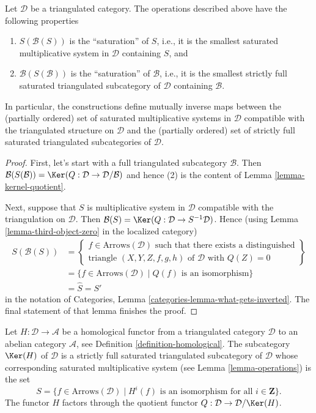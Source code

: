 \begin{lemma}
\label{lemma-operations}
Let $\mathcal{D}$ be a triangulated category. The operations described above
have the following properties
\begin{enumerate}
\item $S(\mathcal{B}(S))$ is the ``saturation'' of $S$, i.e., it is the
smallest saturated multiplicative system in $\mathcal{D}$ containing $S$, and
\item $\mathcal{B}(S(\mathcal{B}))$ is the ``saturation'' of $\mathcal{B}$,
i.e., it is the smallest strictly full saturated triangulated subcategory of
$\mathcal{D}$ containing $\mathcal{B}$.
\end{enumerate}
In particular, the constructions define mutually inverse maps between
the (partially ordered) set of saturated multiplicative systems in
$\mathcal{D}$ compatible with the triangulated structure on $\mathcal{D}$
and
the (partially ordered) set of strictly full saturated triangulated
subcategories of $\mathcal{D}$.
\end{lemma}

\begin{proof}
First, let's start with a full triangulated subcategory $\mathcal{B}$. Then
$\mathcal{B}(S(\mathcal{B})) =
\Ker(Q : \mathcal{D} \to \mathcal{D}/\mathcal{B})$
and hence (2) is the content of
Lemma \ref{lemma-kernel-quotient}.

\medskip\noindent
Next, suppose that $S$ is multiplicative system in $\mathcal{D}$ compatible
with the triangulation on $\mathcal{D}$. Then
$\mathcal{B}(S) = \Ker(Q : \mathcal{D} \to S^{-1}\mathcal{D})$.
Hence (using
Lemma \ref{lemma-third-object-zero}
in the localized category)
\begin{align*}
S(\mathcal{B}(S))
& =
\left\{
\begin{matrix}
f \in \text{Arrows}(\mathcal{D})
\text{ such that there exists a distinguished}\\
\text{triangle }(X, Y, Z, f, g, h) \text{ of }\mathcal{D}\text{ with }Q(Z) = 0
\end{matrix}
\right\}
\\
& =
\{f \in \text{Arrows}(\mathcal{D}) \mid Q(f)\text{ is an isomorphism}\} \\
& = \hat S = S'
\end{align*}
in the notation of
Categories, Lemma \ref{categories-lemma-what-gets-inverted}.
The final statement of that lemma finishes the proof.
\end{proof}

\begin{lemma}
\label{lemma-acyclic-general}
Let $H : \mathcal{D} \to \mathcal{A}$ be a homological functor from a
triangulated category $\mathcal{D}$ to an abelian category $\mathcal{A}$, see
Definition \ref{definition-homological}.
The subcategory $\Ker(H)$ of $\mathcal{D}$ is a strictly full
saturated triangulated subcategory of $\mathcal{D}$ whose corresponding
saturated multiplicative system (see
Lemma \ref{lemma-operations})
is the set
$$
S = \{f \in \text{Arrows}(\mathcal{D}) \mid
H^i(f)\text{ is an isomorphism for all }i \in \mathbf{Z}\}.
$$
The functor $H$ factors through the quotient functor
$Q : \mathcal{D} \to \mathcal{D}/\Ker(H)$.
\end{lemma}

